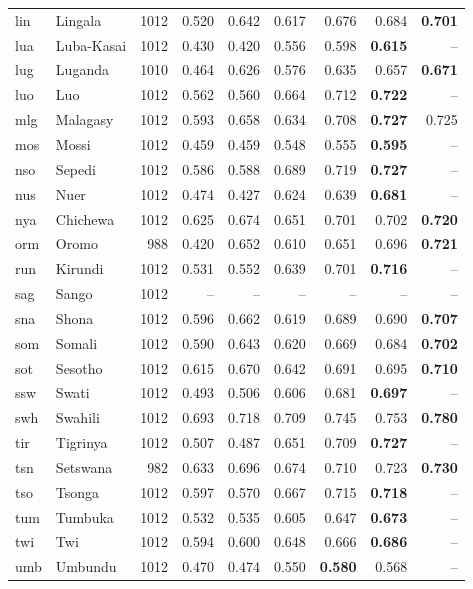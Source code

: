 {\begin{longtable}{@{}llrrrrrrr@{}}
lin & Lingala & 1012 & 0.520 & 0.642 & 0.617 & 0.676 & 0.684 & \textbf{0.701} \\
lua & Luba-Kasai & 1012 & 0.430 & 0.420 & 0.556 & 0.598 & \textbf{0.615} & -- \\
lug & Luganda & 1010 & 0.464 & 0.626 & 0.576 & 0.635 & 0.657 & \textbf{0.671} \\
luo & Luo & 1012 & 0.562 & 0.560 & 0.664 & 0.712 & \textbf{0.722} & -- \\
mlg & Malagasy & 1012 & 0.593 & 0.658 & 0.634 & 0.708 & \textbf{0.727} & 0.725 \\
mos & Mossi & 1012 & 0.459 & 0.459 & 0.548 & 0.555 & \textbf{0.595} & -- \\
nso & Sepedi & 1012 & 0.586 & 0.588 & 0.689 & 0.719 & \textbf{0.727} & -- \\
nus & Nuer & 1012 & 0.474 & 0.427 & 0.624 & 0.639 & \textbf{0.681} & -- \\
nya & Chichewa & 1012 & 0.625 & 0.674 & 0.651 & 0.701 & 0.702 & \textbf{0.720} \\
orm & Oromo & 988 & 0.420 & 0.652 & 0.610 & 0.651 & 0.696 & \textbf{0.721} \\
run & Kirundi & 1012 & 0.531 & 0.552 & 0.639 & 0.701 & \textbf{0.716} & -- \\
sag & Sango & 1012 & -- & -- & -- & -- & -- & -- \\
sna & Shona & 1012 & 0.596 & 0.662 & 0.619 & 0.689 & 0.690 & \textbf{0.707} \\
som & Somali & 1012 & 0.590 & 0.643 & 0.620 & 0.669 & 0.684 & \textbf{0.702} \\
sot & Sesotho & 1012 & 0.615 & 0.670 & 0.642 & 0.691 & 0.695 & \textbf{0.710} \\
ssw & Swati & 1012 & 0.493 & 0.506 & 0.606 & 0.681 & \textbf{0.697} & -- \\
swh & Swahili & 1012 & 0.693 & 0.718 & 0.709 & 0.745 & 0.753 & \textbf{0.780} \\
tir & Tigrinya & 1012 & 0.507 & 0.487 & 0.651 & 0.709 & \textbf{0.727} & -- \\
tsn & Setswana & 982 & 0.633 & 0.696 & 0.674 & 0.710 & 0.723 & \textbf{0.730} \\
tso & Tsonga & 1012 & 0.597 & 0.570 & 0.667 & 0.715 & \textbf{0.718} & -- \\
tum & Tumbuka & 1012 & 0.532 & 0.535 & 0.605 & 0.647 & \textbf{0.673} & -- \\
twi & Twi & 1012 & 0.594 & 0.600 & 0.648 & 0.666 & \textbf{0.686} & -- \\
umb & Umbundu & 1012 & 0.470 & 0.474 & 0.550 & \textbf{0.580} & 0.568 & -- \\

\end{longtable}}
